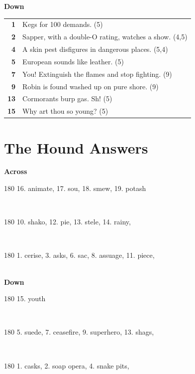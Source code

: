 \documentclass[a4paper,twoside,twocolumn]{article}
\begin{document}
\noindent \textbf{Down} \\[2ex]
{
\renewcommand{\arraystretch}{1.2}
\begin{tabular}{r p{6.7cm}}
 \textbf{1} & Kegs for 100 demands. (5) \\
 \textbf{2} & Sapper, with a double-O rating, watches a show. (4,5) \\
 \textbf{4} & A skin pest disfigures in dangerous places. (5,4) \\
 \textbf{5} & European sounds like leather. (5) \\
 \textbf{7} & You! Extinguish the flames and stop fighting. (9) \\
 \textbf{9} & Robin is found washed up on pure shore. (9) \\
 \textbf{13} & Cormorants burp gas. Sh! (5) \\
 \textbf{15} & Why art thou so young? (5) \\
\end{tabular}}






\section{The Hound Answers}

\noindent \textbf{Across} \\
\begin{turn}{180} 
 16. animate,
 17. sou,
 18. smew,
 19. potash
\end{turn} \\
\begin{turn}{180}
 10. shako,
 12. pie,
 13. stele,
 14. rainy,
 \end{turn} \\
\begin{turn}{180}
 1. cerise,
 3. asks,
 6. sac,
 8. assuage,
 11. piece,
\end{turn} \\

\noindent \textbf{Down} \\
\begin{turn}{180}
15. youth
\end{turn} \\
\begin{turn}{180}
5. suede,
7. ceasefire,
9. superhero,
13. shags,
\end{turn} \\
\begin{turn}{180}
1. casks,
2. soap opera,
4. snake pits,
\end{turn}
\end{document}
